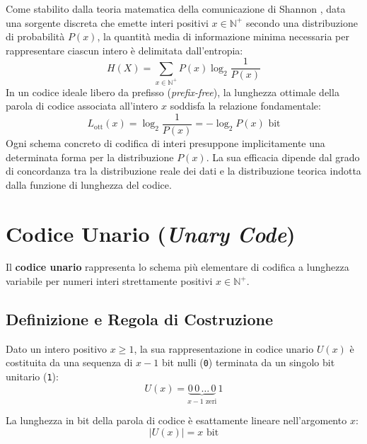 Come stabilito dalla teoria matematica della comunicazione di Shannon \cite{shannon1948}, data una sorgente discreta che emette interi positivi $x \in \mathbb{N}^+$ secondo una distribuzione di probabilit\`a $P(x)$, la quantit\`a media di informazione minima necessaria per rappresentare ciascun intero \`e delimitata dall'entropia:
\begin{equation}
  H(X) = \sum_{x \in \mathbb{N}^+} P(x) \log_2 \frac{1}{P(x)}
\end{equation}
In un codice ideale libero da prefisso (\textit{prefix-free}), la lunghezza ottimale della parola di codice associata all'intero $x$ soddisfa la relazione fondamentale:
\begin{equation}
  L_{\text{ott}}(x) = \log_2 \frac{1}{P(x)} = -\log_2 P(x) \text{ bit}
\end{equation}
Ogni schema concreto di codifica di interi presuppone implicitamente una determinata forma per la distribuzione $P(x)$. La sua efficacia dipende dal grado di concordanza tra la distribuzione reale dei dati e la distribuzione teorica indotta dalla funzione di lunghezza del codice.

\FloatBarrier
\section{Codice Unario (\textit{Unary Code})}
\label{sec:codice-unario}

Il \textbf{codice unario} rappresenta lo schema pi\`u elementare di codifica a lunghezza variabile per numeri interi strettamente positivi $x \in \mathbb{N}^+$.

\FloatBarrier
\subsection{Definizione e Regola di Costruzione}
\label{subsec:def-unario}

\begin{definition}
Dato un intero positivo $x \ge 1$, la sua rappresentazione in codice unario $U(x)$ \`e costituita da una sequenza di $x - 1$ bit nulli (\texttt{0}) terminata da un singolo bit unitario (\texttt{1}):
\begin{equation}
  U(x) = \underbrace{0 \, 0 \, \dots \, 0}_{x-1 \text{ zeri}} \, 1
\end{equation}
\end{definition}

La lunghezza in bit della parola di codice \`e esattamente lineare nell'argomento $x$:
\begin{equation}
  |U(x)| = x \text{ bit}
\end{equation}

